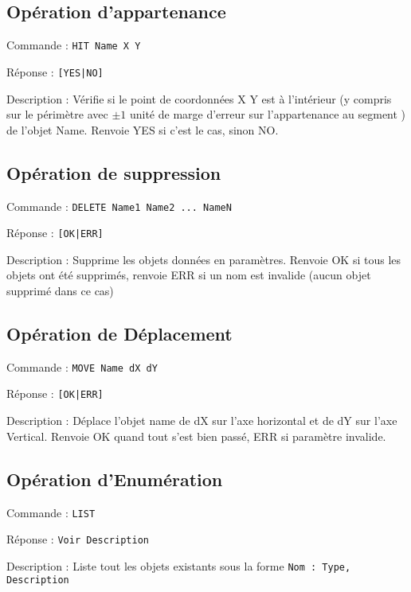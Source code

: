 \documentclass[11pt]{article}
\begin{document}
\subsection{Opération d'appartenance}
Commande : \texttt{HIT Name X Y}

Réponse : \texttt{[YES|NO]}

Description : 
Vérifie si le point de coordonnées X Y est à l'intérieur (y compris sur le périmètre avec $\pm 1$ unité de marge d'erreur sur l’appartenance au segment )
de l'objet  Name. Renvoie YES si c'est le cas, sinon NO.

\subsection{Opération de suppression}
Commande : \texttt{DELETE Name1 Name2 ... NameN}

Réponse : \texttt{[OK|ERR]}

Description : 
Supprime les objets données en paramètres. Renvoie OK si tous les objets ont été supprimés, renvoie ERR si un nom est invalide (aucun objet supprimé dans ce cas)

\subsection{Opération de Déplacement}
Commande : \texttt{MOVE Name dX dY}

Réponse : \texttt{[OK|ERR]}

Description : 
Déplace l'objet name de dX sur l'axe horizontal et de dY sur l'axe Vertical.
Renvoie OK quand tout s'est bien passé, ERR si paramètre invalide.

\subsection{Opération d'Enumération}
Commande : \texttt{LIST}

Réponse : \texttt{Voir Description}

Description : 
Liste tout les objets existants sous la forme \texttt{Nom : Type, Description}
\end{document}
